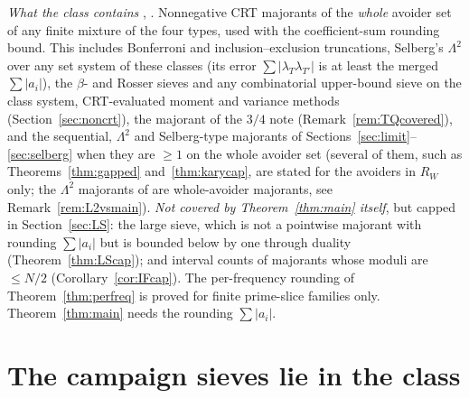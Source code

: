 \documentclass[10pt,reqno]{amsart}
\theoremstyle{definition}
\theoremstyle{remark}
\begin{document}
\emph{What the class contains} \cite[\S6]{KA2}, \cite[(C)]{KA2rev2}.
Nonnegative CRT majorants of the \emph{whole} avoider set of any finite
mixture of the four types, used with the coefficient-sum rounding bound.
This includes Bonferroni and inclusion--exclusion truncations, Selberg's
$\Lambda^2$ over any set system of these classes (its error
$\sum|\lambda_T\lambda_{T'}|$ is at least the merged $\sum|a_i|$), the $\beta$-
and Rosser sieves and any combinatorial upper-bound sieve on the class
system, CRT-evaluated moment and variance methods
(Section~\ref{sec:noncrt}), the majorant of the $3/4$ note
(Remark~\ref{rem:TQcovered}), and the sequential, $\Lambda^2$ and
Selberg-type majorants of Sections~\ref{sec:limit}--\ref{sec:selberg}
when they are $\geq1$ on the whole avoider set (several of them, such
as Theorems~\ref{thm:gapped} and~\ref{thm:karycap}, are stated for the
avoiders in $R_W$ only; the $\Lambda^2$ majorants of \cite{TW2} are whole-avoider
majorants, see Remark~\ref{rem:L2vsmain}).
\emph{Not covered by Theorem~\ref{thm:main} itself}, but capped in
Section~\ref{sec:LS}: the large sieve, which is not a pointwise majorant
with rounding $\sum|a_i|$ but is bounded below by one through duality
(Theorem~\ref{thm:LScap}); and interval counts of majorants whose moduli
are $\leq N/2$ (Corollary~\ref{cor:IFcap}).  The per-frequency rounding of
Theorem~\ref{thm:perfreq} is proved for finite prime-slice families only.
Theorem~\ref{thm:main} needs the rounding $\sum|a_i|$.

\section{The campaign sieves lie in the class}\label{sec:campaign}
\end{document}
